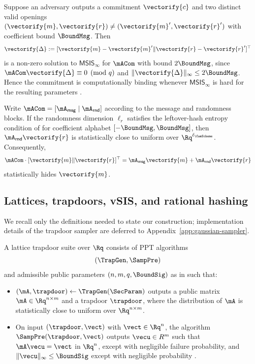 \begin{lemma}\label{lem:ajtai-binding}
Suppose an adversary outputs a commitment \(\vectorify{c}\) and two distinct valid openings
\((\vectorify{m},\vectorify{r})\neq(\vectorify{m}',\vectorify{r}')\) with coefficient bound \(\BoundMsg\). Then
\[
  \vectorify{\Delta}:=[\vectorify{m}-\vectorify{m}'\Vert \vectorify{r}-\vectorify{r}']^\top
\]
is a non-zero solution to \(\mathsf{MSIS}_\infty\) for \(\mACom\) with bound \(2\BoundMsg\), since
\(\mACom\vectorify{\Delta}\equiv 0\pmod q\) and \(\|\vectorify{\Delta}\|_\infty\le 2\BoundMsg\). Hence the commitment is
computationally binding whenever \(\mathsf{MSIS}_\infty\) is hard for the resulting parameters
\cite[Lemma~2]{EPRINT:AttCraKoh21}.
\end{lemma}

\begin{lemma}\label{lem:ajtai-hiding}
Write \(\mACom=[\mA_{\mathsf{msg}}\mid \mA_{\mathsf{rnd}}]\) according to the message and randomness blocks. If the
randomness dimension \(\ell_r\) satisfies the leftover-hash entropy condition of
\cite[Lemma~1]{EPRINT:AttCraKoh21} for coefficient alphabet \([-\BoundMsg,\BoundMsg]\), then
\(\mA_{\mathsf{rnd}}\vectorify{r}\) is statistically close to uniform over \(\Rq^{\ell_{\ComScheme}}\). Consequently,
\[
  \mACom\cdot[\vectorify{m}\Vert \vectorify{r}]^\top
  = \mA_{\mathsf{msg}}\vectorify{m}+\mA_{\mathsf{rnd}}\vectorify{r}
\]
statistically hides \(\vectorify{m}\).
\end{lemma}

\subsection{Lattices, trapdoors, vSIS, and rational hashing}
\label{subsec:prelim-vsis}
We recall only the definitions needed to state our construction; implementation details of the trapdoor sampler are
deferred to Appendix~\ref{app:gaussian-sampler}.

\begin{definition}\label{def:trapdoor-suite}
A lattice trapdoor suite over \(\Rq\) consists of PPT algorithms
\[
  (\TrapGen,\SampPre)
\]
and admissible public parameters \((n,m,q,\BoundSig)\) as in \cite[Definition~1]{EPRINT:DKLW25} such that:
\begin{itemize}[leftmargin=1.25em]
  \item \((\mA,\trapdoor)\gets \TrapGen(\SecParam)\) outputs a public matrix \(\mA\in\Rq^{n\times m}\) and a trapdoor
  \(\trapdoor\), where the distribution of \(\mA\) is statistically close to uniform over \(\Rq^{n\times m}\).
  \item On input \((\trapdoor,\vect)\) with \(\vect\in\Rq^n\), the algorithm \(\SampPre(\trapdoor,\vect)\) outputs
  \(\vecu\in R^m\) such that \(\mA\vecu=\vect\) in \(\Rq^n\), except with negligible failure probability, and
  \(\|\vecu\|_\infty\le \BoundSig\) except with negligible probability
  \cite{STOC:GenPeiVai08,EPRINT:DKLW25}.
\end{itemize}
\end{definition}

